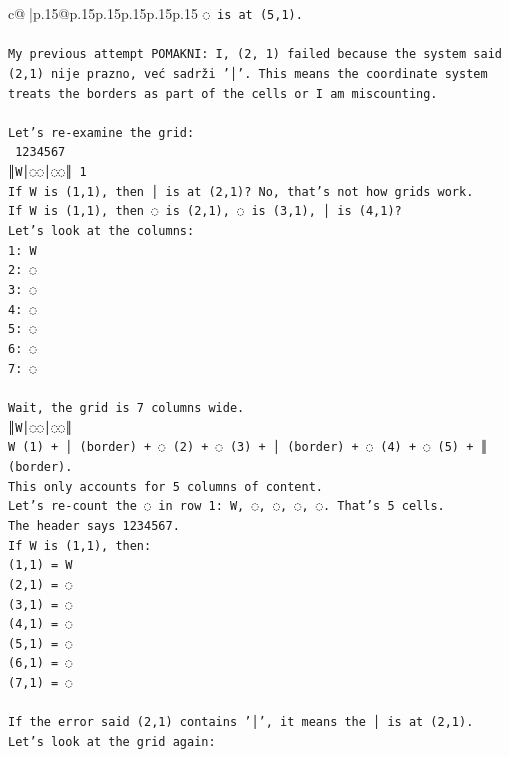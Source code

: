 \documentclass{article}
\begin{document}
{\begin{supertabular}{c@{$\;$}|p{.15\linewidth}@{}p{.15\linewidth}p{.15\linewidth}p{.15\linewidth}p{.15\linewidth}p{.15\linewidth}}
{{{\texttt{◌ is at (5,1).} \\
\\ 
\texttt{My previous attempt POMAKNI: I, (2, 1) failed because the system said (2,1) nije prazno, već sadrži '│'. This means the coordinate system treats the borders as part of the cells or I am miscounting.} \\
\\ 
\texttt{Let's re{-}examine the grid:} \\
\texttt{ 1234567} \\
\texttt{║W│◌◌│◌◌║ 1} \\
\texttt{If W is (1,1), then │ is at (2,1)? No, that's not how grids work.} \\
\texttt{If W is (1,1), then ◌ is (2,1), ◌ is (3,1), │ is (4,1)?} \\
\texttt{Let's look at the columns:} \\
\texttt{1: W} \\
\texttt{2: ◌} \\
\texttt{3: ◌} \\
\texttt{4: ◌} \\
\texttt{5: ◌} \\
\texttt{6: ◌} \\
\texttt{7: ◌} \\
\\ 
\texttt{Wait, the grid is 7 columns wide.} \\
\texttt{║W│◌◌│◌◌║} \\
\texttt{W (1) + │ (border) + ◌ (2) + ◌ (3) + │ (border) + ◌ (4) + ◌ (5) + ║ (border).} \\
\texttt{This only accounts for 5 columns of content.} \\
\texttt{Let's re{-}count the ◌ in row 1: W, ◌, ◌, ◌, ◌. That's 5 cells.} \\
\texttt{The header says 1234567.} \\
\texttt{If W is (1,1), then:} \\
\texttt{(1,1) = W} \\
\texttt{(2,1) = ◌} \\
\texttt{(3,1) = ◌} \\
\texttt{(4,1) = ◌} \\
\texttt{(5,1) = ◌} \\
\texttt{(6,1) = ◌} \\
\texttt{(7,1) = ◌} \\
\\ 
\texttt{If the error said (2,1) contains '│', it means the │ is at (2,1).} \\
\texttt{Let's look at the grid again:} \\
}}}
\end{supertabular}}
\end{document}
